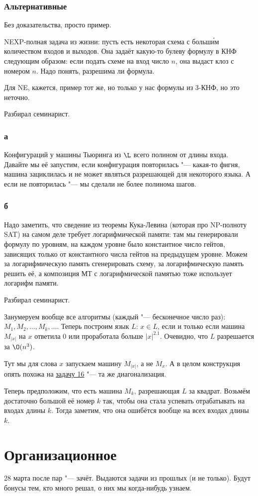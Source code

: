 	\subsubsection{Альтернативные}
		Без доказательства, просто пример.

		NEXP-полная задача из жизни: пусть есть некоторая схема с больш\'им количеством входов и выходов.
		Она задаёт какую-то булеву формулу в КНФ следующим образом: если подать схеме на вход число $n$,
		она выдаст клоз с номером $n$.
		Надо понять, разрешима ли формула.

		Для NE, кажется, пример тот же, но только у нас формулы из 3-КНФ, но это неточно.

	Разбирал семинарист.

	\subsubsection{а}
		Конфигураций у машины Тьюринга из $\L$ всего полином от длины входа.
		Давайте мы её запустим, если конфигурация повторилась "--- какая-то фигня, машина зациклилась и не может являться разрешающей для некоторого языка.
		А если не повторилась "--- мы сделали не более полинома шагов.

	\subsubsection{б}
		Надо заметить, что сведение из теоремы Кука-Левина (которая про NP-полноту SAT) на самом деле требует логарифмической памяти:
		там мы генерировали формулу по уровням, на каждом уровне было константное число гейтов,
		зависящих только от константного числа гейтов на предыдущем уровне.
		Можем за логарифмическую память сгенерировать схему, за логарифмическую память решить её, а композиция МТ
		с логарифмической памятью тоже использует логарифм памяти.

	Разбирал семинарист.

	Занумеруем вообще все алгоритмы (каждый "--- бесконечное число раз): $M_1, M_2, \dots, M_k, \dots$.
	Теперь построим язык $L$: $x \in L$, если и только если машина $M_{|x|}$ на $x$ ответила 0 или проработала
	больше $|x|^{2.1}$.
	Очевидно, что $L$ разрешается за $\O(n^3)$.
	\begin{Rem}
		Тут мы для слова $x$ запускаем машину $M_{|x|}$, а не $M_x$.
		А в целом конструкция опять похожа на \hyperref[prob16]{задачу 16} "--- та же диагонализация.
	\end{Rem}

	Теперь предположим, что есть машина $M_k$, разрешающая $L$ за квадрат.
	Возьмём достаточно большой её номер $k$ так, чтобы она стала успевать отрабатывать на входах длины $k$.
	Тогда заметим, что она ошибётся вообще на всех входах длины $k$.

\section{Организационное}
	28 марта после пар "--- зачёт.
	Выдаются задачи из прошлых (и не только).
	Будут бонусы тем, кто много решал, о них мы когда-нибудь узнаем.
